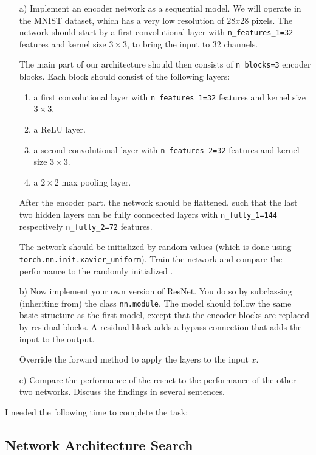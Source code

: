 \begin{enumerate}
\item[a)] Implement an encoder network as a sequential model. We will operate in the MNIST dataset, which has a very low resolution of $28x28$ pixels.  The network should start by a first convolutional layer with \texttt{n\_features\_1=32} features and kernel size $3\times3$, to bring the input to $32$ channels. 

The main part of our architecture should then consists of \texttt{n\_blocks=3} encoder blocks. Each block should consist of the following layers:
\begin{enumerate}
	\item a first convolutional layer with \texttt{n\_features\_1=32} features and kernel size $3\times3$.
	\item a ReLU layer.
	\item a second convolutional layer with \texttt{n\_features\_2=32} features and kernel size $3\times3$.
	\item a $2\times2$ max pooling layer.
\end{enumerate}
After the encoder part, the network should be flattened, such that the last two hidden layers can be fully conncected layers with \texttt{n\_fully\_1=144} respectively \texttt{n\_fully\_2=72} features.

The network should be initialized by random values (which is done using \texttt{torch.nn.init.xavier\_uniform}). Train the network and compare the performance to the randomly initialized \vgg.

\item[b)] Now implement your own version of ResNet. You do so by subclassing (inheriting from) the class \texttt{nn.module}. The model should follow the same basic structure as the first model, except that the encoder blocks are replaced by residual blocks. A residual block adds a bypass connection that adds the input to the output.

Override the forward method to apply the layers to the input $x$.

\item[c)] Compare the performance of the resnet to the performance of the other two networks. Discuss the findings in several sentences.

\end{enumerate}

I needed the following time to complete the task:

\subsection{Network Architecture Search}

